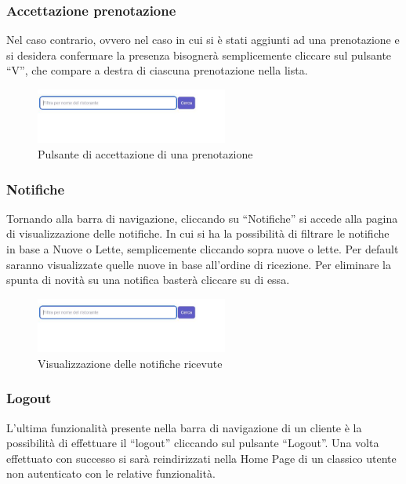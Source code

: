 \subsubsection{Accettazione prenotazione}
Nel caso contrario, ovvero nel caso in cui si è stati aggiunti ad una prenotazione e si desidera confermare la presenza bisognerà semplicemente cliccare sul pulsante ``V'', 
che compare a destra di ciascuna prenotazione nella lista.

\begin{figure}[htbp]
	\centering
	\includegraphics[width=0.5625\textwidth]{./img/Dettaglio.jpg}
	\caption{Pulsante di accettazione di una prenotazione}
\end{figure}

\subsubsection{Notifiche}
Tornando alla barra di navigazione, cliccando su ``Notifiche'' si accede alla pagina di visualizzazione delle notifiche.
In cui si ha la possibilità di filtrare le notifiche in base a Nuove o Lette, semplicemente cliccando sopra nuove o lette. Per default 
saranno visualizzate quelle nuove in base all'ordine di ricezione. 
Per eliminare la spunta di novità su una notifica basterà cliccare su di essa.

\begin{figure}[htbp]
	\centering
	\includegraphics[width=0.5625\textwidth]{./img/Dettaglio.jpg}
	\caption{Visualizzazione delle notifiche ricevute}
\end{figure}

\subsubsection{Logout}
L'ultima funzionalità presente nella barra di navigazione di un cliente è la possibilità di effettuare il ``logout'' cliccando sul pulsante ``Logout''.
Una volta effettuato con successo si sarà reindirizzati nella Home Page di un classico utente non autenticato con le relative funzionalità.

